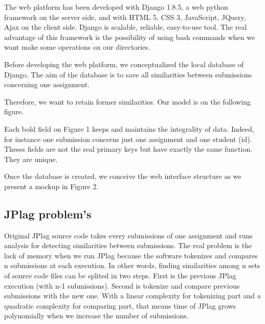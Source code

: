 \documentclass[twoside]{article}
\newenvironment{Figure}
  {\par\medskip\noindent\minipage{\linewidth}}
  {\endminipage\par\medskip}
\begin{document}
\begin{multicols*}{2}
The web platform has been developed with Django 1.8.5, a web python framework on the server side, and with HTML 5, CSS 3, JavaScript, JQuery, Ajax on the client side. Django is scalable, reliable, easy-to-use tool. The real advantage of this framework is the possibility of using bash commands when we want make some operations on our directories. 

Before developing the web platform, we conceptualized the local database of Django. The aim of the database is to save all similarities between submissions concerning one assignment. 

Therefore, we want to retain former similarities. Our model is on the following figure. 
\begin{Figure}
 	\centering
\end{Figure}
Each bold field on Figure 1 keeps and maintains the integrality of data. Indeed, for instance one submission concerns just one assignment and one student (id). Theses fields are not the real primary keys but have exactly the same function. They are unique. 

Once the database is created, we conceive the web interface structure as we present a mockup in Figure 2.
\begin{Figure}
 	\centering
\end{Figure}

\subsection{JPlag problem's}

Original JPlag source code takes every submissions of one assignment and runs analysis for detecting similarities between submissions. The real problem is the lack of memory when we run JPlag because the software tokenizes and compares n submissions at each execution. In other words, finding similarities among n sets of source code files can be splited in two steps. First is the previous JPlag execution (with n-1 submissions). Second is tokenize and compare previous submissions with the new one. With a linear complexity for tokenizing part and a quadratic complexity for comparing part, that means time of JPlag grows polynomially when we increase the number of submissions. 


\end{multicols*}
\end{document}
